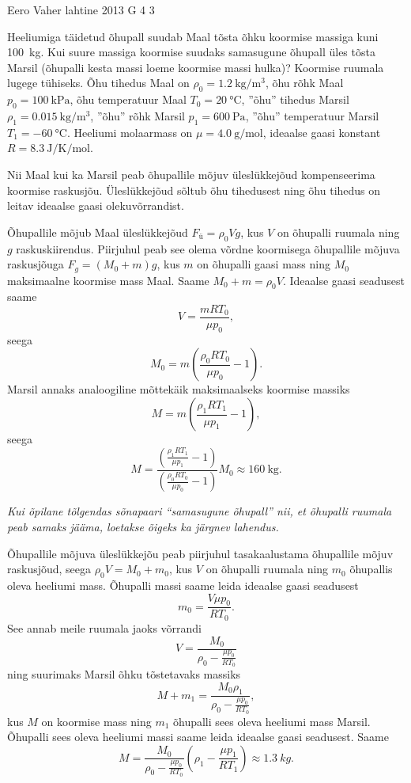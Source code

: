 {Eero Vaher} %
{lahtine} %
{2013} %
{G 4} %
{3} %
{
\ifStatement
Heeliumiga täidetud õhupall suudab Maal tõsta õhku koormise massiga kuni
\SI{100}{\kilogram}. Kui suure massiga koormise suudaks samasugune õhupall
üles tõsta Marsil (õhupalli kesta massi loeme koormise massi hulka)? 
Koormise ruumala lugege tühiseks. Õhu tihedus Maal on
$\rho_0=\SI{1.2}{\kilogram\per\meter^3}$, õhu rõhk Maal
$p_0=\SI{100}{\kilo\pascal}$, õhu temperatuur Maal $T_0=\SI{20}{\celsius}$,
''õhu''
tihedus Marsil $\rho_1=\SI{0.015}{\kilogram\per\meter^3}$, ''õhu'' rõhk Marsil
$p_1=\SI{600}{\pascal}$, ''õhu'' temperatuur Marsil $T_1=\SI{-60}{\celsius}$.
Heeliumi molaarmass on $\mu=\SI{4.0}{\gram\per\mole}$, ideaalse gaasi konstant
$R=\SI{8.3}{\joule\per\kelvin\per\mole}$.
\fi


\ifHint
Nii Maal kui ka Marsil peab õhupallile mõjuv üleslükkejõud kompenseerima koormise raskusjõu. Üleslükkejõud sõltub õhu tihedusest ning õhu tihedus on leitav ideaalse gaasi olekuvõrrandist.
\fi


\ifSolution
Õhupallile mõjub Maal üleslükkejõud $F_{ü}=\rho_0Vg$, kus $V$ on õhupalli ruumala ning $g$ raskuskiirendus. Piirjuhul peab see olema võrdne koormisega õhupallile mõjuva raskusjõuga $F_g=(M_0+m)g$, kus $m$ on õhupalli gaasi mass ning $M_0$ maksimaalne koormise mass Maal. Saame $M_0+m=\rho_0V$. Ideaalse gaasi seadusest saame
\[
V=\frac{mRT_0}{\mu p_0},
\]
seega 
\[
M_0=m\left(\frac{\rho_0 RT_0}{\mu p_0}-1\right).
\]
Marsil annaks analoogiline mõttekäik maksimaalseks koormise massiks
\[
M=m(\frac{\rho_1RT_1}{\mu p_1}-1),
\]
seega
\[M=\frac{\left(\frac{\rho_1RT_1}{\mu p_1}-1\right)}{(\frac{\rho_0RT_0}{\mu p_0}-1)}M_0\approx \SI{160}{\kilogram}.
\]

{\em Kui õpilane tõlgendas sõnapaari ``samasugune õhupall'' nii, et õhupalli ruumala peab samaks jääma, loetakse õigeks ka järgnev lahendus.}

Õhupallile mõjuva üleslükkejõu peab piirjuhul tasakaalustama õhupallile mõjuv raskusjõud, seega $\rho_0 V=M_0+m_0$, kus $V$ on õhupalli ruumala ning $m_0$ õhupallis oleva heeliumi mass. Õhupalli massi saame leida ideaalse gaasi seadusest
\[
m_0=\frac{V\mu p_0}{RT_0}.
\]
See annab meile ruumala jaoks võrrandi
\[
V=\frac{M_0}{\rho_0-\frac{\mu p_0}{RT_0}}
\]
ning suurimaks Marsil õhku tõstetavaks massiks
\[
M+m_1=\frac{M_0\rho_1}{\rho_0-\frac{\mu p_0}{RT_0}},
\]
kus $M$ on koormise mass ning $m_1$ õhupalli sees oleva heeliumi mass Marsil. Õhupalli sees oleva heeliumi massi saame leida ideaalse gaasi seadusest. Saame
\[
M=\frac{M_0}{\rho_0-\frac{\mu p_0}{RT_0}}\left(\rho_1-\frac{\mu p_1}{RT_1}\right)\approx \SI{1,3}{kg}.
\]
\fi


}
